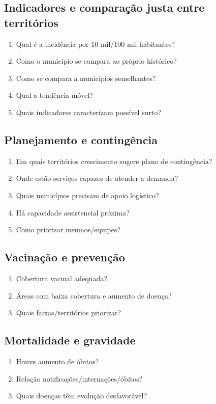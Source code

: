 \documentclass[12pt,a4paper]{article}
\begin{document}
\subsection{Indicadores e comparação justa entre territórios}
\begin{enumerate}[label=\textbf{I\arabic*.},leftmargin=*]\item Qual é a incidência por 10 mil/100 mil habitantes?\item Como o município se compara ao próprio histórico?\item Como se compara a municípios semelhantes?\item Qual a tendência móvel?\item Quais indicadores caracterizam possível surto?\end{enumerate}
\subsection{Planejamento e contingência}
\begin{enumerate}[label=\textbf{C\arabic*.},leftmargin=*]\item Em quais territórios crescimento sugere plano de contingência?\item Onde estão serviços capazes de atender a demanda?\item Quais municípios precisam de apoio logístico?\item Há capacidade assistencial próxima?\item Como priorizar insumos/equipes?\end{enumerate}
\subsection{Vacinação e prevenção}
\begin{enumerate}[label=\textbf{V\arabic*.},leftmargin=*]\item Cobertura vacinal adequada?\item Áreas com baixa cobertura e aumento de doença?\item Quais faixas/territórios priorizar?\end{enumerate}
\subsection{Mortalidade e gravidade}
\begin{enumerate}[label=\textbf{M\arabic*.},leftmargin=*]\item Houve aumento de óbitos?\item Relação notificações/internações/óbitos?\item Quais doenças têm evolução desfavorável?\end{enumerate}
\end{document}
